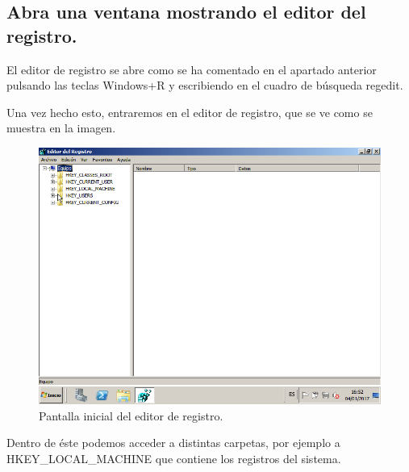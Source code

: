 \subsection{\Large Abra una ventana mostrando el editor del registro. }

	El editor de registro se abre como se ha comentado en el apartado anterior pulsando las teclas Windows+R y escribiendo en el cuadro de búsqueda regedit.
	
	Una vez hecho esto, entraremos en el editor de registro, que se ve como se muestra en la imagen.
	
	\begin{figure}[H] %
		\centering
		\includegraphics[scale=0.5]{imagenes/regedit2.png}  %
		\caption{Pantalla inicial del editor de registro.} \label{fig:figura11}
	\end{figure}
	
	Dentro de éste podemos acceder a distintas carpetas, por ejemplo a HKEY\_LOCAL\_MACHINE que contiene los registros del sistema.
	
